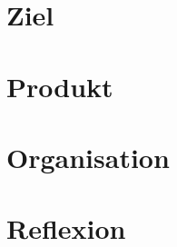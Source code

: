 \documentclass[11pt, oneside, a4paper]{book}
\begin{document}
\pagestyle{empty}

\frontmatter


\tableofcontents

\mainmatter

\part{Ziel}





\part{Produkt}




\part{Organisation}




\part{Reflexion}





% 

\glsaddall
\printglossary
\newpage


\nocite{*}



\end{document}
